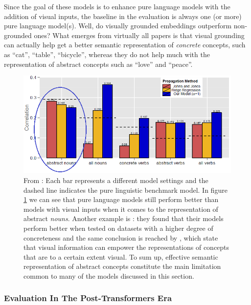\documentclass[
]{krantz}
\begin{document}
Since the goal of these models is to enhance pure language models with the addition of visual inputs, the baseline in the evaluation is always one (or more) pure language model(s). Well, do visually grounded embeddings outperform non-grounded ones? What emerges from virtually all papers is that visual grounding can actually help get a better semantic representation of \emph{concrete} concepts, such as ``cat'', ``table'', ``bicycle'', whereas they do not help much with the representation of abstract concepts such as ``love'' and ``peace''.

\begin{figure}

{\centering \includegraphics[width=1\linewidth]{figures/02-03-img-support-text/img-2014hill-01} 

}

\caption{From \citet{hill2014learning}: Each bar represents a different model settings and the dashed line indicates the pure linguistic benchmark model.
In figure \ref{fig:img-2014hill-01} we can see that pure language models still perform better than models with visual inputs when it comes to the representation of abstract \emph{nouns}. Another example is \citet{kiela2017learning}: they found that their models perform better when tested on datasets with a higher degree of concreteness and the same conclusion is reached by \citet{collell2017imagined}, which state that visual information can empower the representations of concepts that are to a certain extent visual. To sum up, effective semantic representation of abstract concepts constitute the main limitation common to many of the models discussed in this section.}\label{fig:img-2014hill-01}
\end{figure}




\hypertarget{evaluation-in-the-post-transformers-era}{%
\subsubsection{Evaluation In The Post-Transformers Era}\label{evaluation-in-the-post-transformers-era}}
\end{document}
